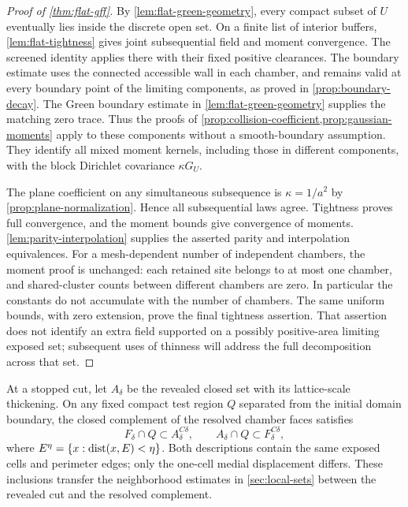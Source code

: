 \begin{proof}[Proof of \cref{thm:flat-gff}]
By \cref{lem:flat-green-geometry}, every compact subset of $U$ eventually
lies inside the discrete open set.
On a finite list of interior buffers, \cref{lem:flat-tightness} gives joint
subsequential field and moment convergence. The screened identity applies
there with their fixed positive clearances. The boundary estimate uses the
connected accessible wall in each chamber, and remains valid at every
boundary point of the limiting components, as proved in
\cref{prop:boundary-decay}. The Green boundary estimate in
\cref{lem:flat-green-geometry} supplies the matching zero trace.
Thus the proofs of
\cref{prop:collision-coefficient,prop:gaussian-moments} apply to these
components without a smooth-boundary assumption. They identify all mixed
moment kernels, including those in different components, with the block
Dirichlet covariance $\kappa G_U$.

The plane coefficient on any simultaneous subsequence is
$\kappa=1/a^2$ by \cref{prop:plane-normalization}. Hence all subsequential
laws agree. Tightness proves full convergence, and the moment bounds give
convergence of moments. \cref{lem:parity-interpolation} supplies the asserted
parity and interpolation equivalences. For a mesh-dependent number of
independent chambers, the moment proof is unchanged: each retained site
belongs to at most one chamber, and shared-cluster counts between different
chambers are zero.
In particular the constants do not accumulate with the number of chambers.
The same uniform bounds, with zero extension, prove the final tightness
assertion. That assertion does not identify an extra field supported on a
possibly positive-area limiting exposed set; subsequent uses of thinness
will address the full decomposition across that set.
\end{proof}

At a stopped cut, let \(A_\delta\) be the revealed closed set with its
lattice-scale thickening. On any fixed compact test region \(Q\) separated
from the initial domain boundary, the closed complement of the resolved
chamber faces satisfies
\[
 F_\delta\cap Q\subset A_\delta^{C\delta},
 \qquad
 A_\delta\cap Q\subset F_\delta^{C\delta},
\]
where \(E^\eta=\{x:\operatorname{dist}(x,E)<\eta\}\). Both descriptions contain the same
exposed cells and perimeter edges; only the one-cell medial displacement
differs. These inclusions transfer the neighborhood estimates in
\cref{sec:local-sets} between the revealed cut and the resolved complement.

